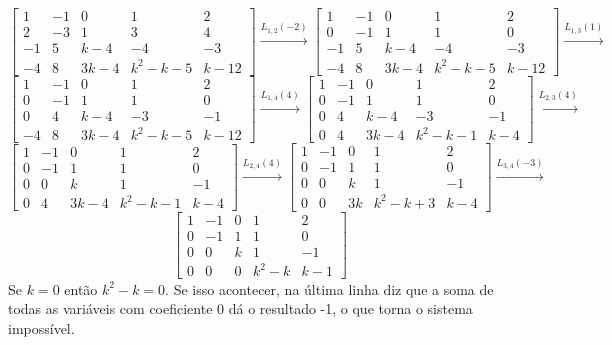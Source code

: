 \documentclass{homework}
\begin{document}
\[\left[\begin{array}{cccc|c}
1 & -1 & 0 & 1 & 2\\
2 & -3 & 1 & 3 & 4\\
-1 & 5 & k-4 & -4 & -3\\
-4 & 8 & 3k-4 & k^2-k-5 & k-12
\end{array}\right] \xrightarrow{L_{1,2}(-2)}
\left[\begin{array}{cccc|c}
1 & -1 & 0 & 1 & 2\\
0 & -1 & 1 & 1 & 0\\
-1 & 5 & k-4 & -4 & -3\\
-4 & 8 & 3k-4 & k^2-k-5 & k-12
\end{array}\right] \xrightarrow{L_{1,3}(1)}\]
\[\left[\begin{array}{cccc|c}
1 & -1 & 0 & 1 & 2\\
0 & -1 & 1 & 1 & 0\\
0 & 4 & k-4 & -3 & -1\\
-4 & 8 & 3k-4 & k^2-k-5 & k-12
\end{array}\right] \xrightarrow{L_{1,4}(4)}
\left[\begin{array}{cccc|c}
1 & -1 & 0 & 1 & 2\\
0 & -1 & 1 & 1 & 0\\
0 & 4 & k-4 & -3 & -1\\
0 & 4 & 3k-4 & k^2-k-1 & k-4
\end{array}\right] \xrightarrow{L_{2,3}(4)}\]
\[\left[\begin{array}{cccc|c}
1 & -1 & 0 & 1 & 2\\
0 & -1 & 1 & 1 & 0\\
0 & 0 & k & 1 & -1\\
0 & 4 & 3k-4 & k^2-k-1 & k-4
\end{array}\right] \xrightarrow{L_{2,4}(4)}
\left[\begin{array}{cccc|c}
1 & -1 & 0 & 1 & 2\\
0 & -1 & 1 & 1 & 0\\
0 & 0 & k & 1 & -1\\
0 & 0 & 3k & k^2-k+3 & k-4
\end{array}\right] \xrightarrow{L_{3,4}(-3)}\]
\[\left[\begin{array}{cccc|c}
1 & -1 & 0 & 1 & 2\\
0 & -1 & 1 & 1 & 0\\
0 & 0 & k & 1 & -1\\
0 & 0 & 0 & k^2-k & k-1
\end{array}\right]\]
Se $k=0$ então $k^2-k=0$. Se isso acontecer, na última linha diz que a soma de todas as variáveis com coeficiente 0 dá o resultado -1, o que torna o sistema impossível.
\end{document}
